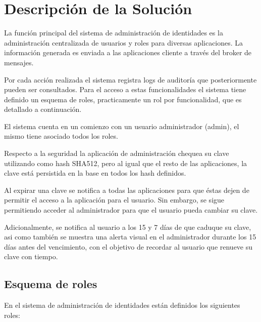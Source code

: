 \section{Descripción de la Solución}

La función principal del sistema de administración de identidades es la administración centralizada de usuarios y roles para diversas aplicaciones. La información generada es enviada a las aplicaciones cliente a través del broker de mensajes.

Por cada acción realizada el sistema registra logs de auditoría que posteriormente pueden ser consultados.
Para el acceso a estas funcionalidades el sistema tiene definido un esquema de roles, practicamente un rol por funcionalidad, que es detallado a continuación. 

El sistema cuenta en un comienzo con un usuario administrador (admin), el mismo tiene asociado todos los roles.

Respecto a la seguridad la aplicación de administración chequea su clave utilizando como hash SHA512, pero al igual que el resto de las aplicaciones, la clave está persistida en la base en todos los hash definidos.

Al expirar una clave se notifica a todas las aplicaciones para que éstas dejen de permitir el acceso a la aplicación
para el usuario. Sin embargo, se sigue permitiendo acceder al administrador para que el usuario pueda cambiar
su clave.

Adicionalmente, se notifica al usuario a los 15 y 7 días de que caduque su clave, asi como también se muestra
una alerta visual en el administrador durante los 15 días antes del vencimiento, con el objetivo de recordar
al usuario que renueve su clave con tiempo.

\subsection{Esquema de roles}

En el sistema de administración de identidades están definidos los siguientes roles:

